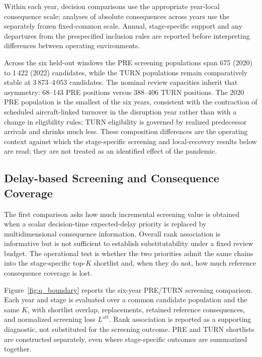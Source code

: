 Within each year, decision comparisons use the appropriate year-local consequence scale; analyses of absolute consequences across years use the separately frozen fixed-common scale. Annual, stage-specific support and any departures from the prespecified inclusion rules are reported before interpreting differences between operating environments.

Across the six held-out windows the PRE screening populations span 675 (2020) to 1\,422 (2022) candidates, while the TURN populations remain comparatively stable at 3\,873--4\,053 candidates. The nominal review capacities inherit that asymmetry: 68--143 PRE positions versus 388--406 TURN positions. The 2020 PRE population is the smallest of the six years, consistent with the contraction of scheduled aircraft-linked turnover in the disruption year rather than with a change in eligibility rules; TURN eligibility is governed by realized predecessor arrivals and shrinks much less. These composition differences are the operating context against which the stage-specific screening and local-recovery results below are read; they are not treated as an identified effect of the pandemic.

\subsection{Delay-based Screening and Consequence Coverage}
\label{subsec:results_screening}

The first comparison asks how much incremental screening value is obtained when a scalar decision-time expected-delay priority is replaced by multidimensional consequence information. Overall rank association is informative but is not sufficient to establish substitutability under a fixed review budget. The operational test is whether the two priorities admit the same chains into the stage-specific top-$K$ shortlist and, when they do not, how much reference consequence coverage is lost.

Figure~\ref{fig:q_boundary} reports the six-year PRE/TURN screening comparison. Each year and stage is evaluated over a common candidate population and the same $K$, with shortlist overlap, replacements, retained reference consequences, and normalized screening loss $L^{\mathrm{att}}$. Rank association is reported as a supporting diagnostic, not substituted for the screening outcome. PRE and TURN shortlists are constructed separately, even where stage-specific outcomes are summarized together.

